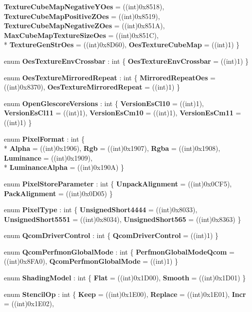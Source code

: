 \begin{DoxyCompactItemize}
{\bfseries Texture\-Cube\-Map\-Negative\-Y\-Oes} = ((int)0x8518), 
{\bfseries Texture\-Cube\-Map\-Positive\-Z\-Oes} = ((int)0x8519), 
{\bfseries Texture\-Cube\-Map\-Negative\-Z\-Oes} = ((int)0x851\-A), 
{\bfseries Max\-Cube\-Map\-Texture\-Size\-Oes} = ((int)0x851\-C), 
\\*
{\bfseries Texture\-Gen\-Str\-Oes} = ((int)0x8\-D60), 
{\bfseries Oes\-Texture\-Cube\-Map} = ((int)1)
 \}
\item 
enum {\bfseries Oes\-Texture\-Env\-Crossbar} \-: int \{ {\bfseries Oes\-Texture\-Env\-Crossbar} = ((int)1)
 \}
\item 
enum {\bfseries Oes\-Texture\-Mirrored\-Repeat} \-: int \{ {\bfseries Mirrored\-Repeat\-Oes} = ((int)0x8370), 
{\bfseries Oes\-Texture\-Mirrored\-Repeat} = ((int)1)
 \}
\item 
enum {\bfseries Open\-Glescore\-Versions} \-: int \{ {\bfseries Version\-Es\-Cl10} = ((int)1), 
{\bfseries Version\-Es\-Cl11} = ((int)1), 
{\bfseries Version\-Es\-Cm10} = ((int)1), 
{\bfseries Version\-Es\-Cm11} = ((int)1)
 \}
\item 
enum {\bfseries Pixel\-Format} \-: int \{ \\*
{\bfseries Alpha} = ((int)0x1906), 
{\bfseries Rgb} = ((int)0x1907), 
{\bfseries Rgba} = ((int)0x1908), 
{\bfseries Luminance} = ((int)0x1909), 
\\*
{\bfseries Luminance\-Alpha} = ((int)0x190\-A)
 \}
\item 
enum {\bfseries Pixel\-Store\-Parameter} \-: int \{ {\bfseries Unpack\-Alignment} = ((int)0x0\-C\-F5), 
{\bfseries Pack\-Alignment} = ((int)0x0\-D05)
 \}
\item 
enum {\bfseries Pixel\-Type} \-: int \{ {\bfseries Unsigned\-Short4444} = ((int)0x8033), 
{\bfseries Unsigned\-Short5551} = ((int)0x8034), 
{\bfseries Unsigned\-Short565} = ((int)0x8363)
 \}
\item 
enum {\bfseries Qcom\-Driver\-Control} \-: int \{ {\bfseries Qcom\-Driver\-Control} = ((int)1)
 \}
\item 
enum {\bfseries Qcom\-Perfmon\-Global\-Mode} \-: int \{ {\bfseries Perfmon\-Global\-Mode\-Qcom} = ((int)0x8\-F\-A0), 
{\bfseries Qcom\-Perfmon\-Global\-Mode} = ((int)1)
 \}
\item 
enum {\bfseries Shading\-Model} \-: int \{ {\bfseries Flat} = ((int)0x1\-D00), 
{\bfseries Smooth} = ((int)0x1\-D01)
 \}
\item 
enum {\bfseries Stencil\-Op} \-: int \{ {\bfseries Keep} = ((int)0x1\-E00), 
{\bfseries Replace} = ((int)0x1\-E01), 
{\bfseries Incr} = ((int)0x1\-E02), 

\end{DoxyCompactItemize}
